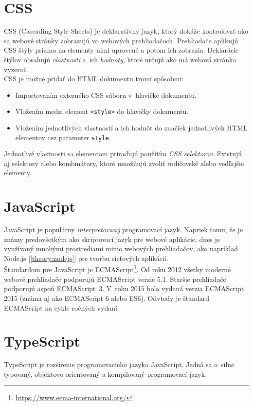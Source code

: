 \section{CSS}
CSS (Cascading Style Sheets) je deklaratívny jazyk, ktorý dokáže kontrolovať ako sa webové stránky zobrazujú vo webových prehliadačoch. Prehliadače aplikujú CSS štýly priamo na elementy nimi upravené a potom ich zobrazia. Deklarácie štýlov obsahujú \emph{vlastnosti} a~ich \emph{hodnoty}, ktoré určujú ako má webová stránka vyzerať. \cite{MDN} \\

\noindent CSS je možné pridať do HTML dokumentu tromi spôsobmi: 
\begin{itemize}
	\item Importovaním externého CSS súboru v~hlavičke dokumentu.
	\item Vložením medzi element \texttt{<style>} do hlavičky dokumentu.
	\item Vložením jednotlivých vlastností a ich hodnôt do značiek jednotlivých HTML elementov cez parameter \texttt{style}.
\end{itemize}

\noindent Jednotlivé vlastnosti sa elementom priraďujú použitím \emph{CSS selektorov}. Existujú aj selektory alebo kombinátory, ktoré umožňujú zvoliť rodičovské alebo vedľajšie elementy. \cite{MDN} \\

\section{JavaScript}
JavaScript je populárny \emph{interpretovaný} programovací jazyk. Napriek tomu, že je známy predovšetkým ako skriptovací jazyk pre webové aplikácie, dnes je využívaný mnohými prostrediami mimo webových prehliadačov, ako napríklad Node.js [\ref{theory:nodejs}] pre tvorbu sieťových aplikácií. \cite{MDN} \\

\noindent Štandardom pre JavaScript je ECMAScript\footnote{\href{https://www.ecma-international.org/}{https://www.ecma-international.org/}}. Od roku 2012 všetky moderné webové prehliadače podporujú ECMAScript verzie 5.1. Staršie prehliadače podporujú aspoň ECMAScript~3. V~roku 2015 bola vydaná verzia ECMAScript 2015 (známa aj ako ECMAScript 6 alebo ES6). Odvtedy je štandard ECMAScript na cykle ročných vydaní. \cite{MDN}

\section{TypeScript}
\label{theory:typescript}
TypeScript je rozšírenie programovacieho jazyka JavaScript. Jedná sa o~silne typovaný, objektovo orientovaný a kompilovaný programovací jazyk. \cite{TSWeb}

